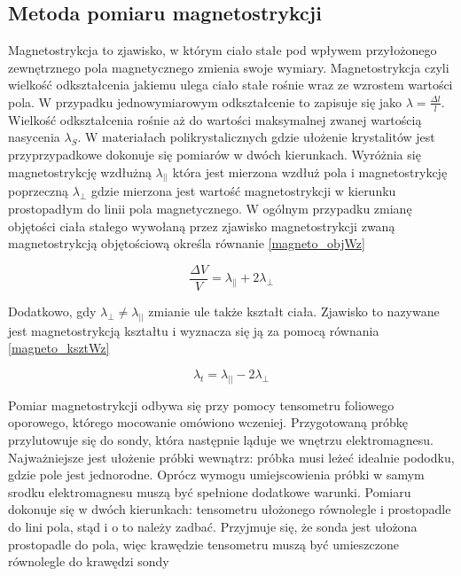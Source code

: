 \documentclass[a4paper,12pt]{article}
\numberwithin{equation}{section}
\begin{document}
\subsection{Metoda pomiaru magnetostrykcji}

Magnetostrykcja to zjawisko, w którym ciało stałe pod wpływem przyłożonego zewnętrznego pola magnetycznego zmienia swoje wymiary. Magnetostrykcja czyli wielkość odkształcenia jakiemu ulega ciało stałe rośnie wraz ze wzrostem 
wartości pola. W przypadku jednowymiarowym odkształcenie to zapisuje się jako $\lambda=\frac{\Delta l}{l}$. Wielkość odkształcenia rośnie aż do wartości maksymalnej zwanej wartością nasycenia $\lambda_S$. W materiałach polikrystalicznych gdzie ułożenie krystalitów jest przyprzypadkowe dokonuje się pomiarów w dwóch 
kierunkach. Wyróżnia się magnetostrykcję wzdłużną $\lambda_{||}$ która jest mierzona wzdłuż pola i magnetostrykcję poprzeczną $\lambda_{\perp}$ gdzie mierzona jest wartość magnetostrykcji w kierunku prostopadłym do linii pola
magnetycznego. W ogólnym przypadku zmianę objętości ciała stałego wywołaną przez zjawisko magnetostrykcji zwaną magnetostrykcją objętościową określa równanie \ref{magneto_objWz}

  \begin{equation}
 \frac{\Delta V}{V}=\lambda_{||}+2\lambda_{\perp}
 \label{magneto_objWz}
 \end{equation}
  
 Dodatkowo, gdy $\lambda_{\perp}\neq\lambda_{||}$ zmianie ule także kształt ciała. Zjawisko to nazywane jest magnetostrykcją kształtu i wyznacza się ją za pomocą równania \ref{magneto_ksztWz} 
 
 \begin{equation}
 \lambda_{t}=\lambda_{||}-2\lambda_{\perp}
 \label{magneto_ksztWz}
 \end{equation}

Pomiar magnetostrykcji odbywa się przy pomocy tensometru foliowego oporowego, którego mocowanie omówiono 
wczeniej. Przygotowaną próbkę przylutowuje się do sondy, która następnie ląduje we wnętrzu elektromagnesu.
Najważniejsze jest ułożenie próbki wewnątrz: próbka musi leżeć idealnie pododku, gdzie pole jest jednorodne. Oprócz 
wymogu umiejscowienia próbki w samym srodku elektromagnesu muszą być spełnione dodatkowe warunki. Pomiaru 
dokonuje się w dwóch kierunkach: tensometru ułożonego równolegle i prostopadle do lini pola, stąd i o to należy
zadbać. Przyjmuje się, że sonda jest ułożona prostopadle do pola, więc krawędzie tensometru muszą być umieszczone
równolegle do krawędzi sondy
\end{document}
